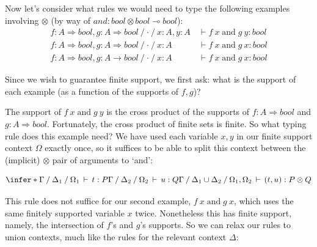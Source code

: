 \documentclass[runningheads]{llncs}
\newcommand\strong[1]{{\bfseries#1}}
\newcommand\todo[1]{{\color{IndianRed}#1}}
\newcommand\xxx{\text{\todo{\strong{XXX}}}}
\newcommand\todolater\todo
\renewcommand\todolater[1]{\todo{\color{RoyalBlue}#1}}
\renewcommand\todo[1]{\ignorespaces}\renewcommand\xxx{\text{\color{IndianRed}\strong{XXX}}}
\newcommand\name[1]{\ensuremath{\mathit{#1}}}
\newcommand\<\:                 %
\newcommand\lto\multimap        %
\newcommand\fto\Rightarrow
\newcommand\ox\otimes
\newcommand\typename\textit
\newcommand\bool{\typename{bool}}
\newcommand\G{\mathrm{\Gamma}}
\newcommand\D{\mathrm{\Delta}}
\renewcommand\O{\mathrm{\Omega}}
\newcommand\emptycx{{\cdot}}
\newcommand\of{\mathbin{:}}
\newcommand\cxsep{\mathbin{/}}
\newcommand\hyp[2]{{#1} \of {#2}}
\newcommand\entails{\,\vdash\,}
\newcommand\J[5]{{#3} \cxsep {#4} \cxsep {#5} \entails {#1} : {#2}}
\newcommand\kword[1]{\ensuremath{\textrm{#1}}}
\newcommand\nil{\name{nil}}
\newcommand\tand{\mathrel{\kword{and}}}
\newcommand\withpair[1]{\ensuremath{\langle{#1}\rangle}}
\newcommand\nat{\mathbb{N}}
\newcommand\natz{\ensuremath{\nat_0}}
\renewcommand\G\Gamma
\renewcommand\D\Delta
\renewcommand\O\Omega
\begin{document}
\noindent
%
Now let's
consider what rules we would need to type the following examples involving $\otimes$ (by way of $\name{and} : \bool \ox \bool \lto \bool$):
%
\begin{align*}
  {\hyp f {A \fto \bool}, \hyp g {A \fto \bool}} \cxsep
  \emptycx \cxsep
  {\hyp x A, \hyp y A}
  &\mathbin{\,\vdash} {f\<x \tand g\<y} : {\bool}\\
  {\hyp f {A \fto \bool}, \hyp g {A \fto \bool}} \cxsep
  \emptycx \cxsep
  {\hyp x A \phantom{, \hyp y A}}
  &\mathbin{\,\vdash} {f\<x \tand g\<x} : \bool\\
  {\hyp f {A \fto \bool}, \hyp g {A \to \bool}} \cxsep
  \emptycx \cxsep
  {\hyp x A \phantom{, \hyp y A}}
  &\mathbin{\,\vdash} {f\<x \tand g\<x} : \bool
\end{align*}


\noindent
Since we wish to guarantee finite support, we first ask:
what is the support of each example (as a function of the supports of $f, g$)?

The support of $f\<x \tand g\<y$ is the cross product of the supports of $f : A \fto \bool$ and $g : A \fto \bool$.
Fortunately, the cross product of finite sets is finite.
So what typing rule does this example need?
We have used each variable $x,y$ in our finite support context $\O$ exactly once, so it suffices to be able to split this context between the (implicit) $\ox$ pair of arguments to `and':

\[
  \infer*{
    \J t P \G {\D_1} {\O_1}
    \\
    \J u Q {\G} {\D_2} {\O_2}
  }{
    \J{(t, u)}{P \ox Q}{\G}{\D_1 \cup \D_2}{\O_1, \O_2}
  }
\]

\noindent
This rule does not suffice for our second example, $f\<x \tand g\<x$, which uses the same finitely supported variable $x$ twice.
Nonetheless this has finite support, namely, the intersection of $f$'s and $g$'s supports.
So we can relax our rules to union contexts, much like the rules for the relevant context $\D$:
\end{document}
